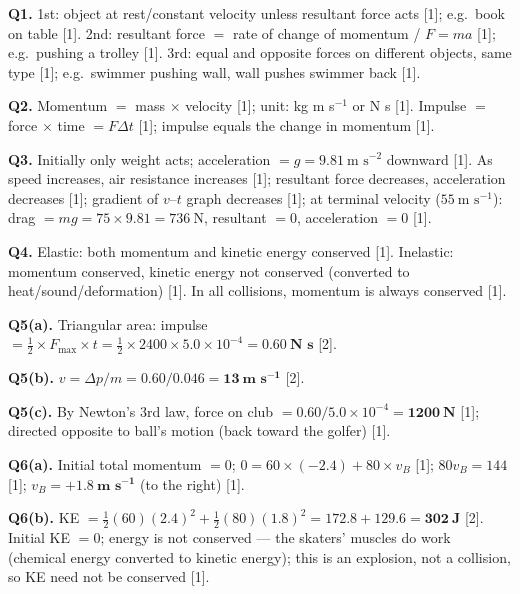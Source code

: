 \begin{markscheme}

\textbf{Q1.} 1st: object at rest/constant velocity unless resultant force acts [1]; e.g.\ book on table [1]. 2nd: resultant force $=$ rate of change of momentum / $F = ma$ [1]; e.g.\ pushing a trolley [1]. 3rd: equal and opposite forces on different objects, same type [1]; e.g.\ swimmer pushing wall, wall pushes swimmer back [1].

\vspace{0.5em}\textbf{Q2.} Momentum $= $ mass $\times$ velocity [1]; unit: kg m s$^{-1}$ or N s [1]. Impulse $=$ force $\times$ time $= F\Delta t$ [1]; impulse equals the change in momentum [1].

\vspace{0.5em}\textbf{Q3.} Initially only weight acts; acceleration $= g = 9.81\ \text{m s}^{-2}$ downward [1]. As speed increases, air resistance increases [1]; resultant force decreases, acceleration decreases [1]; gradient of $v$--$t$ graph decreases [1]; at terminal velocity ($55\ \text{m s}^{-1}$): drag $= mg = 75\times9.81 = 736\ \text{N}$, resultant $= 0$, acceleration $= 0$ [1].

\vspace{0.5em}\textbf{Q4.} Elastic: both momentum and kinetic energy conserved [1]. Inelastic: momentum conserved, kinetic energy not conserved (converted to heat/sound/deformation) [1]. In all collisions, momentum is always conserved [1].

\vspace{0.5em}\textbf{Q5(a).} Triangular area: impulse $= \tfrac{1}{2}\times F_{\max}\times t = \tfrac{1}{2}\times2400\times5.0\times10^{-4} = \mathbf{0.60\ \text{N s}}$ [2].

\vspace{0.5em}\textbf{Q5(b).} $v = \Delta p/m = 0.60/0.046 = \mathbf{13\ \text{m s}^{-1}}$ [2].

\vspace{0.5em}\textbf{Q5(c).} By Newton's 3rd law, force on club $= 0.60/5.0\times10^{-4} = \mathbf{1200\ \text{N}}$ [1]; directed opposite to ball's motion (back toward the golfer) [1].

\vspace{0.5em}\textbf{Q6(a).} Initial total momentum $= 0$; $0 = 60\times(-2.4) + 80\times v_B$ [1]; $80v_B = 144$ [1]; $v_B = \mathbf{+1.8\ \text{m s}^{-1}}$ (to the right) [1].

\vspace{0.5em}\textbf{Q6(b).} KE $= \tfrac{1}{2}(60)(2.4)^2 + \tfrac{1}{2}(80)(1.8)^2 = 172.8 + 129.6 = \mathbf{302\ \text{J}}$ [2]. Initial KE $= 0$; energy is not conserved — the skaters' muscles do work (chemical energy converted to kinetic energy); this is an explosion, not a collision, so KE need not be conserved [1].


\end{markscheme}
